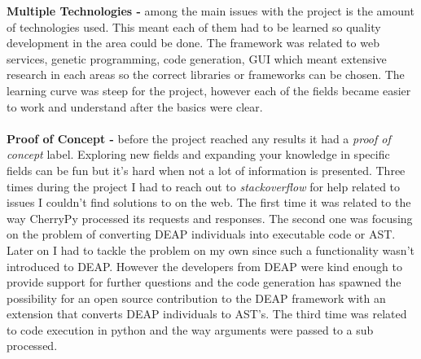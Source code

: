 \textbf{Multiple Technologies -} among the main issues with the project is the amount of technologies used. This meant each of them
had to be learned so quality development in the area could be done. The framework was related to web services, genetic programming,
code generation, GUI which meant extensive research in each areas so the correct libraries or frameworks can be chosen. The learning
curve was steep for the project, however each of the fields became easier to work and understand after the basics were clear.
\paragraph{}
\textbf{Proof of Concept -} before the project reached any results it had a \textit{proof of concept} label. Exploring new fields and
expanding your knowledge in specific fields can be fun but it's hard when not a lot of information is presented. Three times during the
project I had to reach out to \textit{stackoverflow} for help related to issues I couldn't find solutions to on the web. The first
time it was related to the way CherryPy processed its requests and responses. The second one was focusing on the problem of converting
DEAP individuals into executable code or AST. Later on I had to tackle the problem on my own since such a functionality wasn't introduced to DEAP.
However the developers from DEAP were kind enough to provide support for further questions and the code generation has spawned the possibility
for an open source contribution to the DEAP framework with an extension that converts DEAP individuals to AST's. The third time was related
to code execution in python and the way arguments were passed to a sub processed.